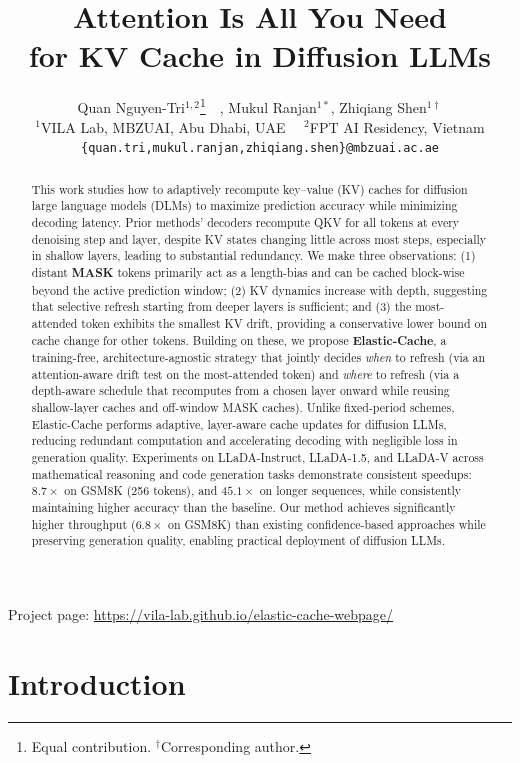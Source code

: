 \documentclass{article} %
\title{Attention Is All You Need \\ for KV Cache in Diffusion LLMs}
\author{Quan Nguyen-Tri$^{1,2}$\thanks{Equal contribution. $^{\dagger}$Corresponding author.}~~, Mukul Ranjan$^{1*}$, Zhiqiang Shen$^{1\dagger}$ \\
$^1$VILA Lab, MBZUAI, Abu Dhabi, UAE~~ $^{2}$FPT AI Residency, Vietnam \\
\texttt{\{quan.tri,mukul.ranjan,zhiqiang.shen\}@mbzuai.ac.ae} \\
}
\theoremstyle{definition}
\theoremstyle{remark}
\begin{document}
\maketitle
\vspace{-15pt} 
{\small Project page: \url{https://vila-lab.github.io/elastic-cache-webpage/} \par}
\vspace{5pt} 

\begin{abstract}

This work studies how to adaptively recompute key–value (KV) caches for diffusion large language models (DLMs) to maximize prediction accuracy while minimizing decoding latency. Prior methods' decoders recompute QKV for all tokens at every denoising step and layer, despite KV states changing little across most steps, especially in shallow layers, leading to substantial redundancy. We make three observations: (1) distant {\bf MASK} tokens primarily act as a length-bias and can be cached block-wise beyond the active prediction window; (2) KV dynamics increase with depth, suggesting that selective refresh starting from deeper layers is sufficient; and (3) the most-attended token exhibits the smallest KV drift, providing a conservative lower bound on cache change for other tokens. Building on these, we propose {\bf Elastic-Cache}, a training-free, architecture-agnostic strategy that jointly decides {\em when} to refresh (via an attention-aware drift test on the most-attended token) and {\em where} to refresh (via a depth-aware schedule that recomputes from a chosen layer onward while reusing shallow-layer caches and off-window MASK caches). Unlike fixed-period schemes, Elastic-Cache performs adaptive, layer-aware cache updates for diffusion LLMs, reducing redundant computation and accelerating decoding with negligible loss in generation quality.
Experiments on LLaDA-Instruct, LLaDA-1.5, and LLaDA-V across mathematical reasoning and code generation tasks demonstrate consistent speedups: $8.7\times$ on GSM8K (256 tokens), and $45.1\times$ on longer sequences, while consistently maintaining higher accuracy than the baseline. Our method achieves significantly higher throughput ($6.8\times$ on GSM8K) than existing confidence-based approaches while preserving generation quality, enabling practical deployment of diffusion LLMs. 
\end{abstract}

\section{Introduction}
\end{document}
